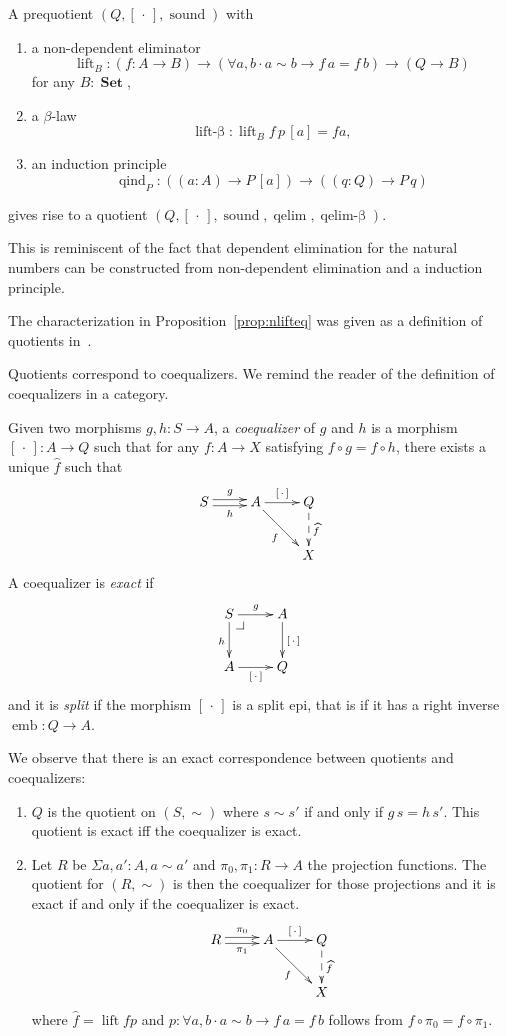 \documentclass[envcountsame]{llncs}
\makeatletter
\newcommand{\dotph}{\,\cdot\,} %
\providecommand{\class}[1]{[#1]}
\providecommand{\dlift}[1]{\widehat{#1}}
\DeclareMathOperator{\Set}{\mathbf{Set}}
\DeclareMathOperator{\sound}{sound}
\DeclareMathOperator{\qelimbeta}{qelim-\beta}
\DeclareMathOperator{\qind}{qind}
\DeclareMathOperator{\emb}{emb}
\DeclareMathOperator{\qelim}{qelim}
\DeclareMathOperator{\lift}{lift}
\DeclareMathOperator{\liftbeta}{lift-\beta}
\renewcommand{\equiv}{=}
\newcommand{\pullbackcorner}[1][dr]{\save*!/#1-1.2pc/#1:(-1,1)@^{|-}\restore}
\makeatother
\begin{document}
\begin{proposition}\label{prop:nlifteq}
A prequotient $(Q,\class\dotph,\sound)$ with

\begin{enumerate}
\item a non-dependent eliminator $$\lift_B\colon (f\colon A \to B) \to (\forall a,b\cdot a\sim b \to f\,a \equiv f\,b) \to (Q \to B)$$ for any $B\colon\Set$,
\item a $\beta$-law $$\liftbeta : \lift_B f \,p\,\class a\equiv f a,$$
\item an induction principle $$\qind_P\colon ((a\colon A)\to P \,\class a)\to ((q\colon Q)\to P\,q)$$
\end{enumerate}
gives rise to a quotient $(Q,\class\dotph,\sound,\qelim,\qelimbeta)$.
\end{proposition}
This is reminiscent of the fact that dependent elimination for the natural numbers can be constructed from non-dependent elimination and a induction principle.

The characterization in Proposition~\ref{prop:nlifteq} was given as a definition of quotients in~\cite{hofmann1995thesis}.


Quotients correspond to coequalizers. We remind the reader of the definition of coequalizers in a category.

\begin{definition}
Given two morphisms $g,h : S\to A$, a \emph{coequalizer} of $g$ and $h$ is a morphism $\class\dotph:A\to Q$ such that for any $f:A\to X$ satisfying $f \circ g = f \circ h$, there exists a unique $\dlift f$ such that
\[\xymatrix{
S\ar@<0.5ex>[r]^g\ar@<-0.5ex>[r]_h& A\ar[r]^{\class\dotph}\ar[dr]_{f} & Q\ar@{-->}[d]^{\dlift f}\\
&&X
}\]
A coequalizer is \emph{exact} if
\[\xymatrix{
S\pullbackcorner\ar[r]^g\ar[d]_h & A\ar[d]^{\class\dotph} \\
A\ar[r]_{\class\dotph} & Q
}\]
and it is \emph{split} if the morphism $\class\dotph$ is a split epi, that is if it has a right inverse $\emb : Q \to A$.
\end{definition}

We observe that there is an exact correspondence between quotients and coequalizers:
\begin{proposition}\hfill
\begin{enumerate}
\item $Q$ is the quotient on $(S,\sim)$ where $s\sim s'$ if and only if $g\,s=h\,s'$.
This quotient is exact if{f} the coequalizer is exact.
\item Let $R$ be $\Sigma a,a':A,a\sim a'$ and $\pi_0,\pi_1 : R\to A$ the projection functions. The quotient for $(R,\sim)$ is then the coequalizer for those projections and it is exact if and only if the coequalizer is exact.
\[\xymatrix{
R\ar@<0.5ex>[r]^{\pi_0}\ar@<-0.5ex>[r]_{\pi_1}& A\ar[r]^{\class\dotph}\ar[dr]_{f} & Q\ar@{-->}[d]^{\dlift f}\\
&&X
}\]
where $\dlift f=\lift f p$ and $p \colon \forall a,b\cdot a\sim b \to f\,a \equiv f\,b$ follows from $f \circ \pi_0 = f \circ \pi_1$.
\end{enumerate}
\end{proposition}
\end{document}
